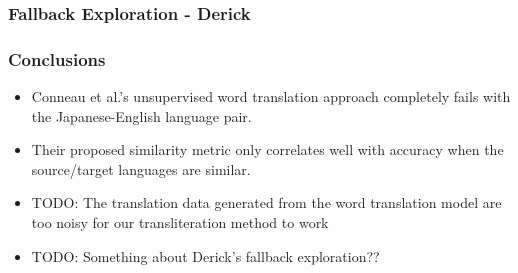 \documentclass{beamer}
\begin{document}
\begin{frame}
  \frametitle{Fallback Exploration - Derick}
\end{frame}

\begin{frame}
  \frametitle{Conclusions}
  \begin{itemize}
  \item Conneau et al.'s unsupervised word translation approach completely fails
    with the Japanese-English language pair.
  \item Their proposed similarity metric only correlates well with accuracy when
    the source/target languages are similar.
  \item TODO: The translation data generated from the word translation model are
    too noisy for our transliteration method to work
  \item TODO: Something about Derick's fallback exploration??
  \end{itemize}
\end{frame}
\end{document}
